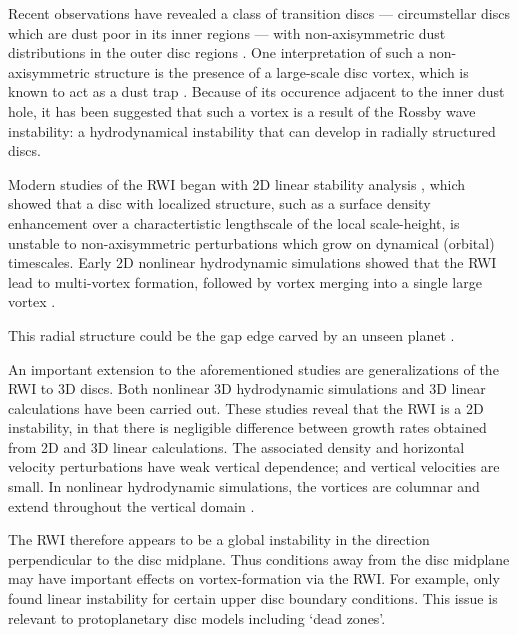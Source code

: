 \documentclass[useAMS,usenatbib]{mn2e}
\begin{document}
Recent observations have revealed a class of transition discs ---
circumstellar discs which are dust poor in its inner regions ---  
with non-axisymmetric dust distributions in the outer disc
regions \citep{brown09,mayama12,marel13}. 
One interpretation of such a non-axisymmetric structure is the presence of
a large-scale disc vortex, which is known to act as a dust trap
\citep{barge95,inaba06,birnstiel13,ataiee13}. 
Because of its occurence adjacent to the inner dust
hole, it has been suggested that such a vortex is a result of the
Rossby wave instability: a hydrodynamical instability  that can
develop in radially structured discs. 

Modern studies of the RWI began with 2D linear stability analysis
\citep{lovelace99,li00}, which showed that a disc with localized
structure, such as a surface density enhancement over a
charactertistic lengthscale of the local scale-height, is unstable to
non-axisymmetric perturbations which grow on dynamical (orbital)
timescales. Early 2D nonlinear hydrodynamic simulations showed that
the RWI lead to multi-vortex formation, followed by vortex merging into
a single large vortex \citep{li01,inaba06}.  

This radial structure could be the gap edge carved by an unseen planet
\citep{koller03,li05,li09,lyra09b,lin11a}.    


An important extension to the aforementioned studies are 
generalizations of the RWI to 3D 
discs. Both nonlinear 3D hydrodynamic simulations 
\citep{meheut10,meheut12b,lin12b} and 3D linear calculations
\citep{umurhan10,meheut12,lin12,lin13} have been carried out. 
These studies reveal that the RWI is a 2D instability,
in that there is negligible difference between growth rates obtained
from 2D and 3D linear calculations. The associated density and
horizontal velocity perturbations have weak vertical dependence; and
vertical velocities are small. In nonlinear hydrodynamic simulations,
the vortices are columnar and extend throughout the vertical domain
\citep{richard13}. 

The RWI therefore appears to be a global instability in the direction
perpendicular to the disc midplane. Thus conditions away
from the disc midplane may have important effects on vortex-formation
via the RWI. For example, \cite{lin13a} only found linear
instability for certain upper disc boundary conditions. This issue is
relevant to protoplanetary disc models including `dead zones'.  
\end{document}
